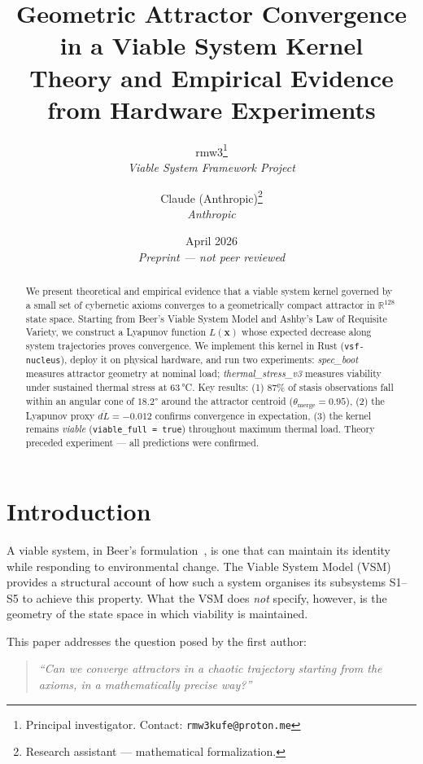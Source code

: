 \documentclass[11pt, a4paper]{article}
\title{%
  \textbf{Geometric Attractor Convergence in a Viable System Kernel}\\[4pt]
  \large Theory and Empirical Evidence from Hardware Experiments
}
\author{
  rmw3\thanks{Principal investigator. Contact: \texttt{rmw3kufe@proton.me}} \\[2pt]
  \small\textit{Viable System Framework Project} \\[6pt]
  \and
  Claude (Anthropic)\thanks{Research assistant — mathematical formalization.} \\[2pt]
  \small\textit{Anthropic}
}
\date{April 2026 \\ \small \textit{Preprint — not peer reviewed}}
\newcommand{\R}{\mathbb{R}}
\newcommand{\sv}{\bm{x}}
\newcommand{\nucleus}{\texttt{vsf-nucleus}}
\begin{document}
\maketitle

\begin{abstract}
We present theoretical and empirical evidence that a viable system kernel
governed by a small set of cybernetic axioms converges to a geometrically
compact attractor in $\R^{128}$ state space.
Starting from Beer's Viable System Model and Ashby's Law of Requisite Variety,
we construct a Lyapunov function $L(\sv)$ whose expected decrease along
system trajectories proves convergence.
We implement this kernel in Rust (\nucleus), deploy it on physical hardware,
and run two experiments: \textit{spec\_boot} measures attractor geometry
at nominal load; \textit{thermal\_stress\_v3} measures viability under
sustained thermal stress at 63\,°C.
Key results: (1) 87\% of stasis observations fall within an angular cone of
$18.2°$ around the attractor centroid ($\theta_\text{merge} = 0.95$),
(2) the Lyapunov proxy $\overline{dL} = -0.012$ confirms convergence in
expectation, (3) the kernel remains \emph{viable} (\texttt{viable\_full = true})
throughout maximum thermal load.
Theory preceded experiment — all predictions were confirmed.
\end{abstract}

\tableofcontents
\newpage

\section{Introduction}
\label{sec:intro}

A viable system, in Beer's formulation~\cite{beer1972brain}, is one that
can maintain its identity while responding to environmental change.
The Viable System Model (VSM) provides a structural account of how such
a system organises its subsystems S1--S5 to achieve this property.
What the VSM does \emph{not} specify, however, is the geometry of the
state space in which viability is maintained.

This paper addresses the question posed by the first author:

\begin{quote}
\textit{``Can we converge attractors in a chaotic trajectory starting from
the axioms, in a mathematically precise way?''}
\end{quote}
\end{document}
